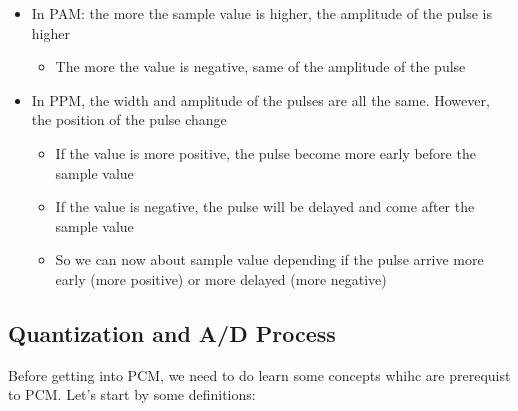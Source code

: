 \begin{itemize}

\item In PAM: the more the sample value is higher, the amplitude of the pulse is higher

	\begin{itemize}
	\item The more the value is negative, same of the amplitude of the pulse
	\end{itemize}

\item In PPM, the width and amplitude of the pulses are all the same. However, the position of the pulse change

	\begin{itemize}
	\item If the value is more positive, the pulse become more early before the sample value
	
	\item If the value is negative, the pulse will be delayed and come after the sample value
	
	\item So we can now about sample value depending if the pulse arrive more early (more positive) or more delayed (more negative)
	\end{itemize}

\end{itemize}


\subsection{Quantization and A/D Process}

Before getting into PCM, we need to do learn some concepts whihc are prerequist to PCM. Let's start by some definitions:

